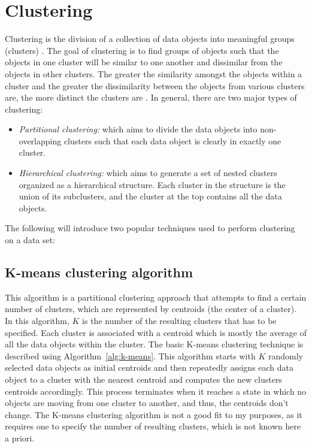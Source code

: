 \section{Clustering}  \label{ch3-clustering}
Clustering is the division of a collection of data objects into meaningful groups (clusters) \cite{jain1999data}. The goal of clustering is to find groups of objects such that the objects in one cluster will be similar to one another and dissimilar from the objects in other clusters. The greater the similarity amongst the objects within a cluster and the greater the dissimilarity between the objects from various clusters are, the more distinct the clusters are \cite{tan2005data}.  In general, there are two major types of clustering:

\begin{itemize} [leftmargin=.4in]
\item \emph{Partitional clustering:} which aims to divide the data objects into non-overlapping clusters such that each data object is clearly in exactly one cluster.
\item \emph{Hierarchical clustering:} which aims to generate a set of nested clusters organized as a hierarchical structure. Each cluster in the structure is the union of its subclusters, and the cluster at the top contains all the data objects.
\end{itemize}

The following will introduce two popular techniques used to perform clustering on a data set:

\subsection{K-means clustering algorithm}
This algorithm is a partitional clustering approach that attempts to find a certain number of clusters, which are represented by centroids (the center of a cluster). In this algorithm, ${K}$ is the number of the resulting clusters that has to be specified. Each cluster is associated with a centroid which is mostly the average of all the
data objects within the cluster. The basic K-means clustering technique is described using Algorithm~\ref{alg:k-means}. This algorithm starts with $K$ randomly selected data objects as initial centroids and then repeatedly assigns each data object to a cluster with the nearest centroid and computes the new clusters centroids accordingly. This process terminates when it reaches a state in which no objects are moving from one cluster to another, and thus, the centroids don't change.
The K-means clustering algorithm is not a good fit to my purposes, as it requires one to specify the number of resulting clusters, which is not known here a priori. %

